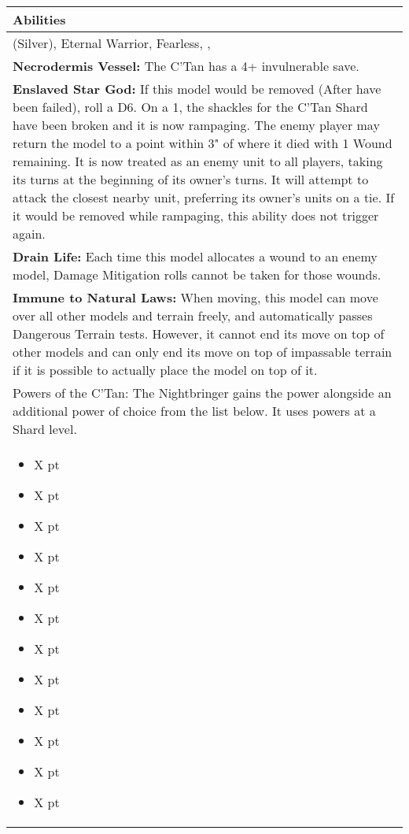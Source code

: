 \noindent
\begin{tabular}{||m{532pt}||}
	\hline
	Abilities \\
	\hline
	\quickref{Awakening Protocols} (Silver), Eternal Warrior, Fearless, \quickref{Living Metal}, \quickref{Reanimation Protocols} \\
	\textbf{Necrodermis Vessel:} The C'Tan has a 4+ invulnerable save. \\
	\textbf{Enslaved Star God:} If this model would be removed (After \quickref{Reanimation Protocols} have been failed), roll a D6. On a 1, the shackles for the C'Tan Shard have been broken and it is now rampaging. The enemy player may return the model to a point within 3" of where it died with 1 Wound remaining. It is now treated as an enemy unit to all players, taking its turns at the beginning of its owner's turns. It will attempt to attack the closest nearby unit, preferring its owner's units on a tie. If it would be removed while rampaging, this ability does not trigger again. \\
	\textbf{Drain Life:} Each time this model allocates a wound to an enemy model, Damage Mitigation rolls cannot be taken for those wounds. \\
	\textbf{Immune to Natural Laws:} When moving, this model can move over all other models and terrain 	freely, and automatically passes Dangerous Terrain tests. However, it cannot end its move on top of other models and can only end its move on top of impassable terrain if it is possible to actually place the model on top of it. \\
	Powers of the C'Tan: The Nightbringer gains the \quickref{Gaze of Death} power alongside an additional power of choice from the list below. It uses powers at a Shard level. \\
	\begin{itemize}
		\item \quickref{Antimatter Meteor} \hrulefill X pt
		\item \quickref{Cosmic Fire} \hrulefill X pt
		\item \quickref{Entropic Touch} \hrulefill X pt
		\item \quickref{Moulder of Worlds} \hrulefill X pt
		\item \quickref{Pyreshards} \hrulefill X pt
		\item \quickref{Sentient Singularity} \hrulefill X pt
		\item \quickref{Seismic Assault} \hrulefill X pt
		\item \quickref{Sky of Falling Stars} \hrulefill X pt
		\item \quickref{Swarm of Spirit Dust} \hrulefill X pt
		\item \quickref{Time's Arrow} \hrulefill X pt
		\item \quickref{Transdimensional Thunderbolt} \hrulefill X pt
		\item \quickref{Withering Worldscape} \hrulefill X pt
	\end{itemize} \\
	\hline
\end{tabular}




